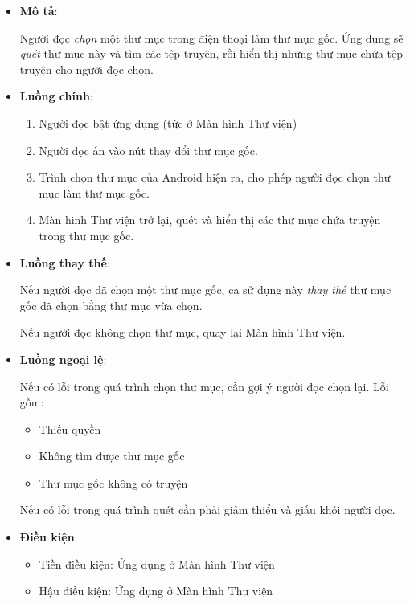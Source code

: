\documentclass[../../thesis]{subfiles}
\begin{document}
\begin{itemize}
    \item
        \textbf{Mô tả}:

        Người đọc \emph{chọn} một thư mục trong điện thoại làm thư mục gốc. Ứng
        dụng sẽ \emph{quét} thư mục này và tìm các tệp truyện, rồi hiển thị
        những thư mục chứa tệp truyện cho người đọc chọn.
    \item
        \textbf{Luồng chính}:

        \begin{enumerate}
            \item
                Người đọc bật ứng dụng (tức ở Màn hình Thư viện)
            \item
                Người đọc ấn vào nút thay đổi thư mục gốc.
            \item
                Trình chọn thư mục của Android hiện ra, cho phép người đọc chọn
                thư mục làm thư mục gốc.
            \item
                Màn hình Thư viện trở lại, quét và hiển thị các thư mục chứa
                truyện trong thư mục gốc.
        \end{enumerate}
    \item
        \textbf{Luồng thay thế}:

        Nếu người đọc đã chọn một thư mục gốc, ca sử dụng này \emph{thay thế}
        thư mục gốc đã chọn bằng thư mục vừa chọn.

        Nếu người đọc không chọn thư mục, quay lại Màn hình Thư viện.
    \item
        \textbf{Luồng ngoại lệ}:

        Nếu có lỗi trong quá trình chọn thư mục, cần gợi ý người đọc chọn lại.
        Lỗi gồm:

        \begin{itemize}
            \item
                Thiếu quyền
            \item
                Không tìm được thư mục gốc
            \item
                Thư mục gốc không có truyện
        \end{itemize}

        Nếu có lỗi trong quá trình quét cần phải giảm thiểu và giấu khỏi người
        đọc.
    \item
        \textbf{Điều kiện}:

        \begin{itemize}
            \item
                Tiền điều kiện: Ứng dụng ở Màn hình Thư viện
            \item
                Hậu điều kiện: Ứng dụng ở Màn hình Thư viện


\end{itemize}
\end{itemize}
\end{document}
